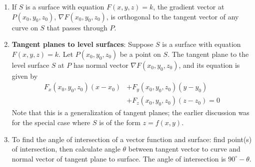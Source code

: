 \documentclass[10pt]{article}
\begin{document}
\begin{multicols*}{2}
\begin{enumerate}
\begin{enumerate}
        \item If $S$ is a surface with equation $F(x,y,z)=k$, the gradient vector at $P(x_0, y_0, z_0)$, $\nabla F(x_0, y_0, z_0)$, is orthogonal to the tangent vector of any curve on $S$ that passes through $P$.
        \item \textbf{Tangent planes to level surfaces}: Suppose $S$ is a surface with equation $F(x,y,z)=k$. Let $P(x_0, y_0, z_0)$ be a point on $S$. The tangent plane to the level surface $S$ at $P$ has normal vector $\nabla F(x_0, y_0, z_0)$, and its equation is given by
        \begin{align*}
            F_x(x_0, y_0, z_0)(x-x_0) &+ F_y(x_0, y_0, z_0)(y-y_0) \\ &+ F_z(x_0, y_0, z_0)(z-z_0)=0
        \end{align*}
        Note that this is a generalization of tangent planes; the earlier discussion was for the special case where $S$ is of the form $z=f(x,y)$.
        \item To find the angle of intersection of a vector function and surface: find point(s) of intersection, then calculate angle $\theta$ between tangent vector to curve and normal vector of tangent plane to surface. The angle of intersection is $90^\circ - \theta$.
    \end{enumerate}
    

\end{enumerate}
\end{multicols*}
\end{document}
